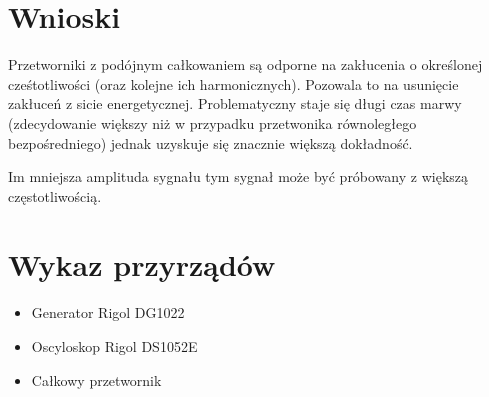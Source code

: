 \documentclass[11pt]{article}
\begin{document}
\section{Wnioski}
Przetworniki z podójnym całkowaniem są odporne na zakłucenia o określonej cześtotliwości
(oraz kolejne ich harmonicznych).
Pozowala to na usunięcie zakłuceń z sicie energetycznej.
Problematyczny staje się długi czas marwy 
(zdecydowanie większy niż w przypadku przetwonika równoległego bezpośredniego) jednak uzyskuje się znacznie większą dokładność. 

Im mniejsza amplituda sygnału tym sygnał może być próbowany z większą częstotliwością.

\section{Wykaz przyrządów}
\begin{itemize}
\item{Generator Rigol DG1022}
\item{Oscyloskop Rigol DS1052E}
\item{Całkowy przetwornik }
\end{itemize} 
\end{document}
